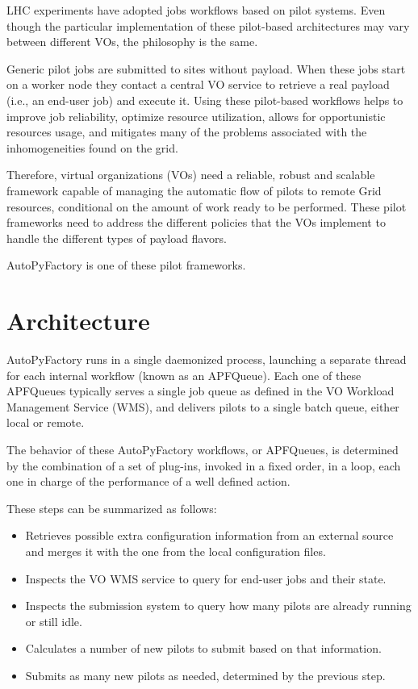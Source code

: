 \documentclass[a4paper]{jpconf}
\begin{document}
LHC experiments have adopted jobs workflows based on pilot systems.
Even though the particular implementation of these pilot-based architectures may
vary between different VOs, the philosophy is the same. 

Generic pilot jobs are submitted to sites without payload. 
When these jobs start on a worker node they contact a central VO
service to retrieve a real payload (i.e., an end-user job) and execute it.
Using these pilot-based workflows helps to improve job reliability,
optimize resource utilization, allows for opportunistic resources usage, 
and mitigates many of the problems associated with the inhomogeneities found on the grid.

Therefore, virtual organizations (VOs) need a reliable, robust and scalable
framework capable of managing the automatic flow of pilots to remote Grid
resources, conditional on the amount of work ready to be performed.
These pilot frameworks need to address the different policies that the VOs
implement to handle the different types of payload flavors.

AutoPyFactory is one of these pilot frameworks.


\section{Architecture}

AutoPyFactory runs in a single daemonized process,
launching a separate thread for each internal workflow (known as an APFQueue).
Each one of these APFQueues typically serves a single job queue 
as defined in the VO Workload Management Service (WMS), 
and delivers pilots to a single batch queue, either local or remote. 

The behavior of these AutoPyFactory workflows, or APFQueues,
is determined by the combination of a set of plug-ins, 
invoked in a fixed order, in a loop, each one in charge of the performance of a well defined action.

These steps can be summarized as follows:
\begin{itemize}
    \item Retrieves possible extra configuration information from an external source 
          and merges it with the one from the local configuration files.
    \item Inspects the VO WMS service to query for end-user jobs and their state.
    \item Inspects the submission system to query how many pilots are already running or still idle.
    \item Calculates a number of new pilots to submit based on that information.
    \item Submits as many new pilots as needed, determined by the previous step.
\end{itemize}
\end{document}

